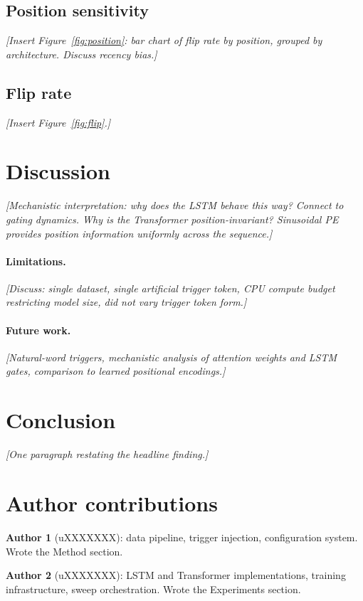 \documentclass[10pt,a4paper]{article}
\begin{document}
\subsection{Position sensitivity}
\textit{[Insert Figure~\ref{fig:position}: bar chart of flip rate by position,
grouped by architecture. Discuss recency bias.]}

\subsection{Flip rate}
\textit{[Insert Figure~\ref{fig:flip}.]}

\section{Discussion}
\label{sec:discussion}

\textit{[Mechanistic interpretation: why does the LSTM behave this way?
Connect to gating dynamics. Why is the Transformer position-invariant?
Sinusoidal PE provides position information uniformly across the sequence.]}

\paragraph{Limitations.}
\textit{[Discuss: single dataset, single artificial trigger token, CPU compute
budget restricting model size, did not vary trigger token form.]}

\paragraph{Future work.}
\textit{[Natural-word triggers, mechanistic analysis of attention weights and
LSTM gates, comparison to learned positional encodings.]}

\section{Conclusion}
\label{sec:conclusion}

\textit{[One paragraph restating the headline finding.]}

\section*{Author contributions}

\textbf{Author 1} (uXXXXXXX): data pipeline, trigger injection, configuration
system. Wrote the Method section.

\textbf{Author 2} (uXXXXXXX): LSTM and Transformer implementations, training
infrastructure, sweep orchestration. Wrote the Experiments section.
\end{document}
